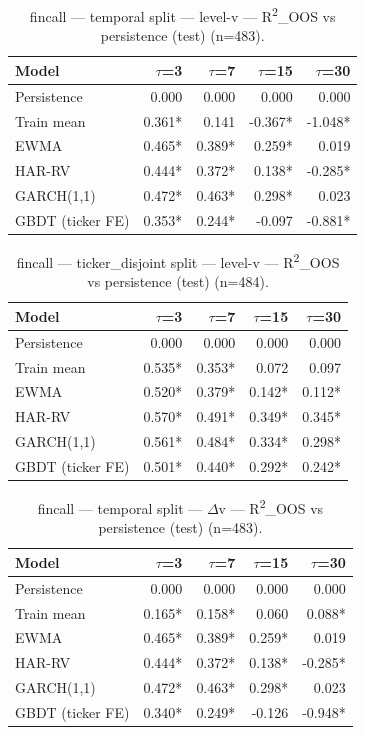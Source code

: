 
\begin{table}[t]
\centering
\begin{tabular}{lrrrr}
\toprule
Model & $\tau$=3 & $\tau$=7 & $\tau$=15 & $\tau$=30 \\
\midrule
Persistence & 0.000 & 0.000 & 0.000 & 0.000 \\
Train mean & 0.361* & 0.141 & -0.367* & -1.048* \\
EWMA & 0.465* & 0.389* & 0.259* & 0.019 \\
HAR-RV & 0.444* & 0.372* & 0.138* & -0.285* \\
GARCH(1,1) & 0.472* & 0.463* & 0.298* & 0.023 \\
GBDT (ticker FE) & 0.353* & 0.244* & -0.097 & -0.881* \\
\bottomrule
\end{tabular}
\caption{fincall — temporal split — level-v — R\textsuperscript{2}\_OOS vs persistence (test) (n=483).}
\end{table}

\begin{table}[t]
\centering
\begin{tabular}{lrrrr}
\toprule
Model & $\tau$=3 & $\tau$=7 & $\tau$=15 & $\tau$=30 \\
\midrule
Persistence & 0.000 & 0.000 & 0.000 & 0.000 \\
Train mean & 0.535* & 0.353* & 0.072 & 0.097 \\
EWMA & 0.520* & 0.379* & 0.142* & 0.112* \\
HAR-RV & 0.570* & 0.491* & 0.349* & 0.345* \\
GARCH(1,1) & 0.561* & 0.484* & 0.334* & 0.298* \\
GBDT (ticker FE) & 0.501* & 0.440* & 0.292* & 0.242* \\
\bottomrule
\end{tabular}
\caption{fincall — ticker\_disjoint split — level-v — R\textsuperscript{2}\_OOS vs persistence (test) (n=484).}
\end{table}

\begin{table}[t]
\centering
\begin{tabular}{lrrrr}
\toprule
Model & $\tau$=3 & $\tau$=7 & $\tau$=15 & $\tau$=30 \\
\midrule
Persistence & 0.000 & 0.000 & 0.000 & 0.000 \\
Train mean & 0.165* & 0.158* & 0.060 & 0.088* \\
EWMA & 0.465* & 0.389* & 0.259* & 0.019 \\
HAR-RV & 0.444* & 0.372* & 0.138* & -0.285* \\
GARCH(1,1) & 0.472* & 0.463* & 0.298* & 0.023 \\
GBDT (ticker FE) & 0.340* & 0.249* & -0.126 & -0.948* \\
\bottomrule
\end{tabular}
\caption{fincall — temporal split — $\Delta$v — R\textsuperscript{2}\_OOS vs persistence (test) (n=483).}
\end{table}

